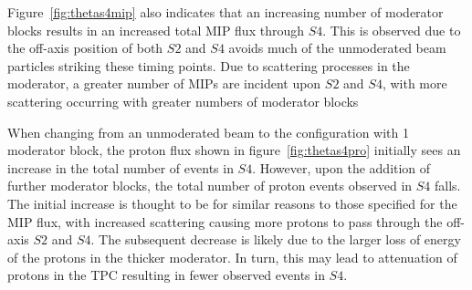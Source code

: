    	Figure~\ref{fig:thetas4mip} also indicates that an increasing number of moderator blocks results in an increased total MIP flux through $S4$.
   	This is observed due to the off-axis position of both $S2$ and $S4$ avoids much of the unmoderated beam particles striking these timing points.
   	Due to scattering processes in the moderator, a greater number of MIPs are incident upon $S2$ and $S4$, with more scattering occurring with greater numbers of moderator blocks
   	
   	When changing from an unmoderated beam to the configuration with 1 moderator block, the proton flux shown in figure~\ref{fig:thetas4pro} initially sees an increase in the total number of events in $S4$.
   	However, upon the addition of further moderator blocks, the total number of proton events observed in $S4$ falls.
   	The initial increase is thought to be for similar reasons to those specified for the MIP flux, with increased scattering causing more protons to pass through the off-axis $S2$ and $S4$.
   	The subsequent decrease is likely due to the larger loss of energy of the protons in the thicker moderator.
   	In turn, this may lead to attenuation of protons in the TPC resulting in fewer observed events in $S4$.
   
